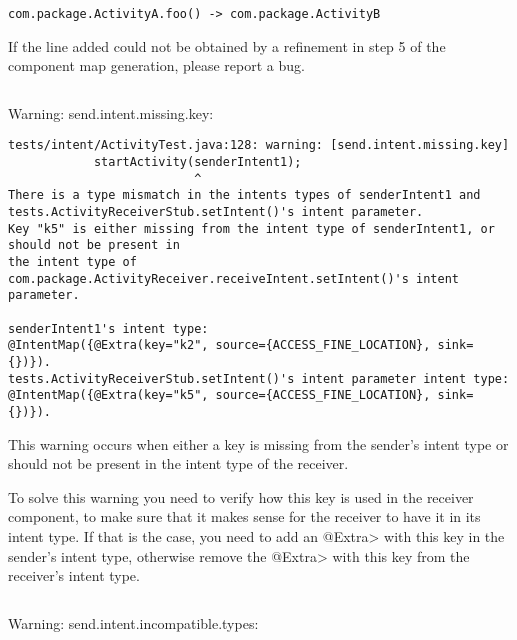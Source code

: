 \begin{Verbatim}
com.package.ActivityA.foo() -> com.package.ActivityB
\end{Verbatim}

If the line added could not be obtained by a refinement in step 5 of the
component map generation, please report a bug.
\begin{Verbatim}

\end{Verbatim}

\noindent
Warning: send.intent.missing.key:

\begin{Verbatim}
tests/intent/ActivityTest.java:128: warning: [send.intent.missing.key] 
            startActivity(senderIntent1);
                          ^
There is a type mismatch in the intents types of senderIntent1 and
tests.ActivityReceiverStub.setIntent()'s intent parameter.
Key "k5" is either missing from the intent type of senderIntent1, or should not be present in
the intent type of com.package.ActivityReceiver.receiveIntent.setIntent()'s intent parameter.

senderIntent1's intent type:
@IntentMap({@Extra(key="k2", source={ACCESS_FINE_LOCATION}, sink={})}).
tests.ActivityReceiverStub.setIntent()'s intent parameter intent type:
@IntentMap({@Extra(key="k5", source={ACCESS_FINE_LOCATION}, sink={})}).
\end{Verbatim}

This warning occurs when either a key is missing from the sender's intent type
or should not be present in the intent type of the receiver.

To solve this warning you need to verify how this key is used in the receiver
component, to make sure that it makes sense for the receiver to have it in its
intent type. If that is the case, you need to add an \<@Extra> with this key in the
sender's intent type, otherwise remove the \<@Extra> with this key from the
receiver's intent type.

\begin{Verbatim}

\end{Verbatim}

\noindent
Warning: send.intent.incompatible.types:

